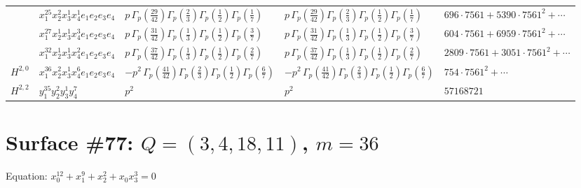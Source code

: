\documentclass[11pt]{article}
\begin{document}
\begin{table}[ht]
{\begin{tabular}{@{}lllll@{}}
 & $x_{1}^{25} x_{2}^{2} x_{3}^{1} x_{4}^{1}  e_{1} e_{2} e_{3} e_{4}$ & $p \, \Gamma_p \left( \frac{29}{42} \right) \Gamma_p \left( \frac{2}{3} \right) \Gamma_p \left( \frac{1}{2} \right) \Gamma_p \left( \frac{1}{7} \right)$ & $p \, \Gamma_p \left( \frac{29}{42} \right) \Gamma_p \left( \frac{2}{3} \right) \Gamma_p \left( \frac{1}{2} \right) \Gamma_p \left( \frac{1}{7} \right)$ & $696{\cdot}7561{+}5390{\cdot}7561^{2}{+}\cdots$ \\
 & $x_{1}^{27} x_{2}^{1} x_{3}^{1} x_{4}^{3}  e_{1} e_{2} e_{3} e_{4}$ & $p \, \Gamma_p \left( \frac{31}{42} \right) \Gamma_p \left( \frac{1}{3} \right) \Gamma_p \left( \frac{1}{2} \right) \Gamma_p \left( \frac{3}{7} \right)$ & $p \, \Gamma_p \left( \frac{31}{42} \right) \Gamma_p \left( \frac{1}{3} \right) \Gamma_p \left( \frac{1}{2} \right) \Gamma_p \left( \frac{3}{7} \right)$ & $604{\cdot}7561{+}6959{\cdot}7561^{2}{+}\cdots$ \\
 & $x_{1}^{32} x_{2}^{1} x_{3}^{1} x_{4}^{2}  e_{1} e_{2} e_{3} e_{4}$ & $p \, \Gamma_p \left( \frac{37}{42} \right) \Gamma_p \left( \frac{1}{3} \right) \Gamma_p \left( \frac{1}{2} \right) \Gamma_p \left( \frac{2}{7} \right)$ & $p \, \Gamma_p \left( \frac{37}{42} \right) \Gamma_p \left( \frac{1}{3} \right) \Gamma_p \left( \frac{1}{2} \right) \Gamma_p \left( \frac{2}{7} \right)$ & $2809{\cdot}7561{+}3051{\cdot}7561^{2}{+}\cdots$ \\
\midrule
$H^{2,0}$ & $x_{1}^{36} x_{2}^{2} x_{3}^{1} x_{4}^{6}  e_{1} e_{2} e_{3} e_{4}$ & $- p^{2} \, \Gamma_p \left( \frac{41}{42} \right) \Gamma_p \left( \frac{2}{3} \right) \Gamma_p \left( \frac{1}{2} \right) \Gamma_p \left( \frac{6}{7} \right)$ & $- p^{2} \, \Gamma_p \left( \frac{41}{42} \right) \Gamma_p \left( \frac{2}{3} \right) \Gamma_p \left( \frac{1}{2} \right) \Gamma_p \left( \frac{6}{7} \right)$ & $754{\cdot}7561^{2}{+}\cdots$ \\
\midrule
$H^{2,2}$ & $y_{1}^{35} y_{2}^{2} y_{3}^{1} y_{4}^{7}$ & $p^{2} \,$ & $p^{2} \,$ & $57168721$ \\
\bottomrule
\end{tabular}
}
\renewcommand{\arraystretch}{1.0}
\end{table}

\newpage

\section*{Surface \#77: $Q=(3, 4, 18, 11)$, $m=36$}

Equation: $x_0^{12} + x_1^{9} + x_2^{2} + x_0 x_3^{3} = 0$
\end{document}
